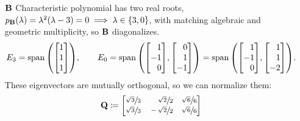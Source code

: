 \documentclass[11pt]{article}
\begin{document}
\begin{enumerate}
\begin{enumerate}[align=left]
              \item[$\mathbf{B}$] Characteristic polynomial has two real roots, $p_{\mathbf{B}}(\lambda) =
                        \lambda^2(\lambda - 3) = 0 \implies \lambda \in \left\{3, 0\right\}$, with matching algebraic and
                    geometric multiplicity, so $\mathbf{B}$ diagonalizes.
                    \[
                        E_3 = \Span \args{
                            \begin{bmatrix*}[r]
                                1 \\ 1 \\ 1
                            \end{bmatrix*}
                        }
                        \! ,
                        \qquad
                        E_0 = \Span \args{
                            \begin{bmatrix*}[r]
                                1 \\ -1 \\ 0
                            \end{bmatrix*}
                            \! ,
                            \begin{bmatrix*}[r]
                                0 \\ 1 \\ -1
                            \end{bmatrix*}
                        }
                        =\Span \args{
                            \begin{bmatrix*}[r]
                                1 \\ -1 \\ 0
                            \end{bmatrix*}
                            \! ,
                            \begin{bmatrix*}[r]
                                1 \\ 1 \\ -2
                            \end{bmatrix*}
                        }
                        \! .
                    \]
                    These eigenvectors are mutually orthogonal, so we can normalize them:
                    \[
                        \mat{Q} \coloneq
                        \begin{bmatrix*}[r]
                            \sfrac{\sqrt{3}}{3} & \sfrac{\sqrt{2}}{2}  & \sfrac{\sqrt{6}}{6}  \\
                            \sfrac{\sqrt{3}}{3} & \sfrac{-\sqrt{2}}{2} & \sfrac{\sqrt{6}}{6}  \\

\end{bmatrix*}\]
\end{enumerate}
\end{enumerate}
\end{document}
